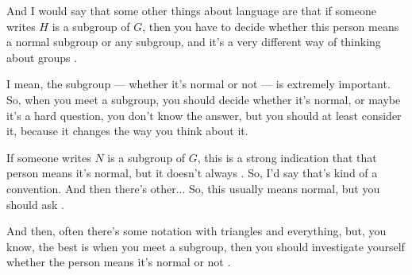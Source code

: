 \begin{speech}[00:08:45 - 00:09:50]
 And I would say that some other things about language are that if someone writes $H$ is a subgroup of $G$, then you have to decide whether this person means a normal subgroup or any subgroup, and it's a very different way of thinking about groups .

I mean, the subgroup --- whether it's normal or not --- is extremely important. So, when you meet a subgroup, you should decide whether it's normal, or maybe it's a hard question, you don't know the answer, but you should at least consider it, because it changes the way you think about it.

If someone writes $N$ is a subgroup of $G$, this is a strong indication that that person means it's normal, but it doesn't always . So, I'd say that's kind of a convention. And then there's other... So, this usually means normal, but you should ask .

And then, often there's some notation with triangles and everything, but, you know, the best is when you meet a subgroup, then you should investigate yourself whether the person means it's normal or not .
\end{speech}

\begin{content}
\end{content}

